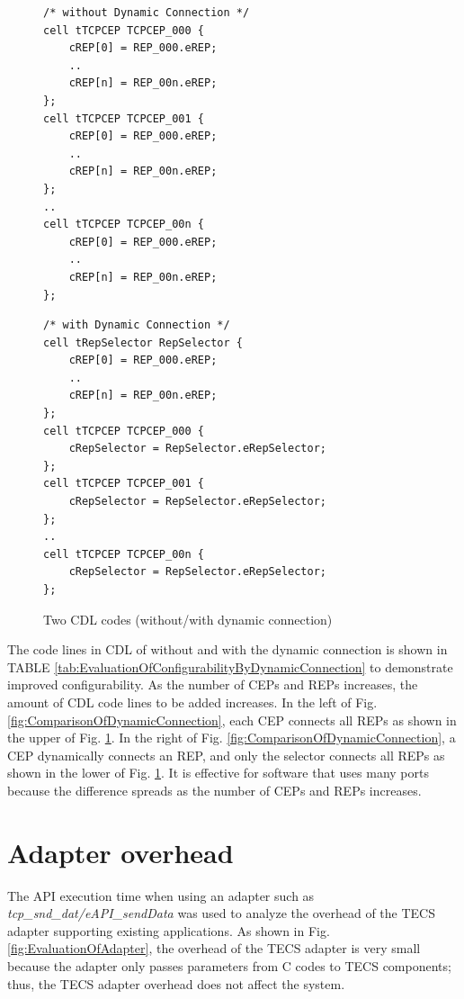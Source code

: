 \documentclass[a4j,12pt,oneside,openany,english]{jsbook}
\begin{document}
\begin{figure}[t]
 \centering
 \begin{lstlisting}
/* without Dynamic Connection */
cell tTCPCEP TCPCEP_000 {
    cREP[0] = REP_000.eREP;
    ..
    cREP[n] = REP_00n.eREP;
};
cell tTCPCEP TCPCEP_001 {
    cREP[0] = REP_000.eREP;
    ..
    cREP[n] = REP_00n.eREP;
};
..
cell tTCPCEP TCPCEP_00n {
    cREP[0] = REP_000.eREP;
    ..
    cREP[n] = REP_00n.eREP;
};
 \end{lstlisting}
 \centering
 \begin{lstlisting}
/* with Dynamic Connection */
cell tRepSelector RepSelector {
    cREP[0] = REP_000.eREP;
    ..
    cREP[n] = REP_00n.eREP;
};
cell tTCPCEP TCPCEP_000 {
    cRepSelector = RepSelector.eRepSelector;
};
cell tTCPCEP TCPCEP_001 {
    cRepSelector = RepSelector.eRepSelector;
};
..
cell tTCPCEP TCPCEP_00n {
    cRepSelector = RepSelector.eRepSelector;
};
 \end{lstlisting}
 \caption{Two CDL codes (without/with dynamic connection)}
 \label{src:ComparisonOfCDL}
\end{figure}

The code lines in CDL of without and with the dynamic connection is shown in TABLE \ref{tab:EvaluationOfConfigurabilityByDynamicConnection} to demonstrate improved configurability.
As the number of CEPs and REPs increases, the amount of CDL code lines to be added increases.
In the left of Fig. \ref{fig:ComparisonOfDynamicConnection}, each CEP connects all REPs as shown in the upper of Fig. \ref{src:ComparisonOfCDL}. 
In the right of Fig. \ref{fig:ComparisonOfDynamicConnection}, a CEP dynamically connects an REP, and only the selector connects all REPs as shown in the lower of Fig. \ref{src:ComparisonOfCDL}. 
It is effective for software that uses many ports because the difference spreads as the number of CEPs and REPs increases.


\section{Adapter overhead}

The API execution time when using an adapter such as {\it tcp\_snd\_dat/eAPI\_sendData} was used to analyze the overhead of the TECS adapter supporting existing applications.
As shown in Fig. \ref{fig:EvaluationOfAdapter}, the overhead of the TECS adapter is very small because the adapter only passes parameters from C codes to TECS components; thus, the TECS adapter overhead does not affect the system.
\end{document}
